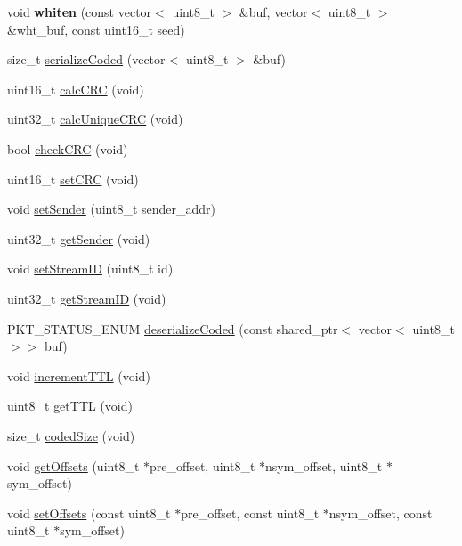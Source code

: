 \begin{DoxyCompactItemize}
void {\bfseries whiten} (const vector$<$ uint8\+\_\+t $>$ \&buf, vector$<$ uint8\+\_\+t $>$ \&wht\+\_\+buf, const uint16\+\_\+t seed)
\item 
size\+\_\+t \hyperlink{classFrame_a2e1d5421694ec4d9abaadacf2b32b492}{serialize\+Coded} (vector$<$ uint8\+\_\+t $>$ \&buf)
\item 
uint16\+\_\+t \hyperlink{classFrame_a84bdc2969f8962206c89c5f916d80973}{calc\+C\+RC} (void)
\item 
uint32\+\_\+t \hyperlink{classFrame_a690b8728c8215af874f0aed2c643d7a6}{calc\+Unique\+C\+RC} (void)
\item 
bool \hyperlink{classFrame_a99bf5c1a41572292c07bc9699a491a96}{check\+C\+RC} (void)
\item 
uint16\+\_\+t \hyperlink{classFrame_aa2de2dba681188cc6ab00dfc42d15426}{set\+C\+RC} (void)
\item 
void \hyperlink{classFrame_a982cef0e09413cc2a5c55298e2cc7c5f}{set\+Sender} (uint8\+\_\+t sender\+\_\+addr)
\item 
uint32\+\_\+t \hyperlink{classFrame_a278632174fa07b44e0dabda3d010f000}{get\+Sender} (void)
\item 
void \hyperlink{classFrame_af3cc33a2ea60ad84db23097da6df3c31}{set\+Stream\+ID} (uint8\+\_\+t id)
\item 
uint32\+\_\+t \hyperlink{classFrame_ad98ec7af45ce4428441d2ee3d28bae7e}{get\+Stream\+ID} (void)
\item 
P\+K\+T\+\_\+\+S\+T\+A\+T\+U\+S\+\_\+\+E\+N\+UM \hyperlink{classFrame_a448b698fd4cc568e610f87f971354dc6}{deserialize\+Coded} (const shared\+\_\+ptr$<$ vector$<$ uint8\+\_\+t $>$$>$ buf)
\item 
void \hyperlink{classFrame_a46139e40aaadc65459f1d094e6f7fc20}{increment\+T\+TL} (void)
\item 
uint8\+\_\+t \hyperlink{classFrame_a383e2fb65096f4c57f37b48d3d74f07d}{get\+T\+TL} (void)
\item 
size\+\_\+t \hyperlink{classFrame_a14c155e1ec94aa20bec722efaff3b25d}{coded\+Size} (void)
\item 
void \hyperlink{classFrame_a66f58470ee6679fb3a46ad7a43e3c5be}{get\+Offsets} (uint8\+\_\+t $\ast$pre\+\_\+offset, uint8\+\_\+t $\ast$nsym\+\_\+offset, uint8\+\_\+t $\ast$sym\+\_\+offset)
\item 
void \hyperlink{classFrame_ac25e10413d25b9eea2502c1c02d457e0}{set\+Offsets} (const uint8\+\_\+t $\ast$pre\+\_\+offset, const uint8\+\_\+t $\ast$nsym\+\_\+offset, const uint8\+\_\+t $\ast$sym\+\_\+offset)
\item 
$$
\end{DoxyCompactItemize}

